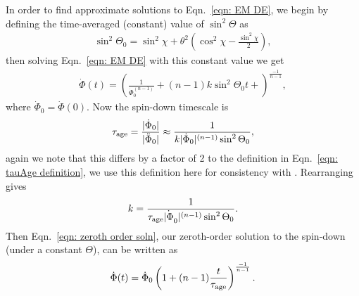 \documentclass[../full_thesis/full_thesis.tex]{subfiles}
\begin{document}
In order to find approximate solutions to Eqn.~\eqref{eqn: EM DE}, we begin by
defining the time-averaged (constant) value of $\sin^{2}\Theta$ as
\begin{align}
\sin^{2}\Theta_0 =
\sin^{2}\chi + \theta^{2}\left(\cos^{2}\chi - \frac{\sin^{2}\chi}{2}\right),
\label{eqn: sin2Theta0}
\end{align}
then solving Eqn.~\eqref{eqn: EM DE} with this constant value we get
\begin{align}
\dot{\Phi}(t) = \left(\frac{1}{\dot{\Phi}_0^{(n-1)}}
                      + (n-1)k\sin^{2}\Theta_0 t + \right)^{\frac{-1}{n-1}},
\label{eqn: zeroth order soln}
\end{align}
where $\dot{\Phi}_0 = \dot{\Phi}(0)$. Now the spin-down timescale is
\begin{align}
\tau_{\mathrm{age}} = \frac{|\dot{\Phi}_0|}{|\ddot{\Phi}_0|}
\approx \frac{1}{k|\dot{\Phi}_0|^{(n-1)} \sin^{2}\Theta_0},
\end{align}
again we note that this differs by a factor of 2 to the definition in
Eqn.~\eqref{eqn: tauAge definition}, we use this definition here for
consistency with \citet{Jones2001}. Rearranging gives
\begin{align}
k = \frac{1}{\tau_{\mathrm{age}} \dot{|\Phi}_0|^{(n-1)} \sin^{2}\Theta_0}.
\end{align}
Then Eqn.~\eqref{eqn: zeroth order soln}, our zeroth-order solution to the
spin-down (under a constant $\Theta$), can be written as
\begin{align}
\dot{\Phi}(t) = \dot{\Phi}_0\left(1 + (n-1)\frac{t}{\tau_{\mathrm{age}}}\right)^{\frac{-1}{n-1}}.
\label{eqn: zeroth order soln complete}
\end{align}
\end{document}
